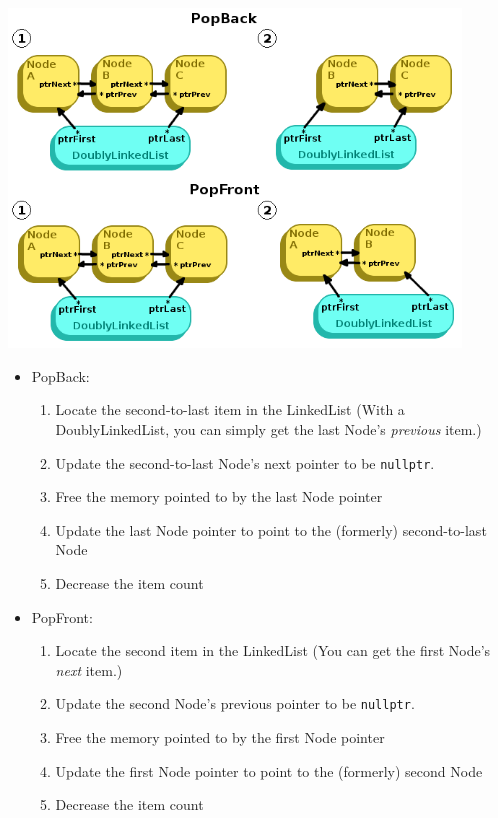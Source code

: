 \documentclass[a4paper,12pt,onepage]{book}
\begin{document}
            \begin{center}
                \includegraphics[height=9cm]{images/linkedlist-popping.png}
            \end{center}
    
            \begin{itemize}
                \item PopBack:
                \begin{enumerate}
                    \item Locate the second-to-last item in the LinkedList (With a DoublyLinkedList, you can
                        simply get the last Node's \textit{previous} item.)
                    \item Update the second-to-last Node's next pointer to be \texttt{nullptr}.
                    \item Free the memory pointed to by the last Node pointer
                    \item Update the last Node pointer to point to the (formerly) second-to-last Node
                    \item Decrease the item count
                \end{enumerate}
                
                \item PopFront:
                \begin{enumerate}
                    \item Locate the second item in the LinkedList (You can
                        get the first Node's \textit{next} item.)
                    \item Update the second Node's previous pointer to be \texttt{nullptr}.
                    \item Free the memory pointed to by the first Node pointer
                    \item Update the first Node pointer to point to the (formerly) second Node
                    \item Decrease the item count
                \end{enumerate}
            \end{itemize}
            
\end{document}
